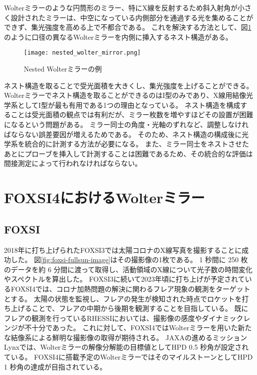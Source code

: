 Wolterミラーのような円筒形のミラー、特にX線を反射するため斜入射角が小さく設計されたミラーは、中空になっている内側部分を通過する光を集めることができず、集光強度を高める上で不都合である。
これを解決する方法として、図\ref{fig:nested_wolter_mirror}のように口径の異なるWolterミラーを内側に挿入するネスト構造がある。\cite{BuitragoCasas2017}

\begin{figure}[b]
\centering
\texttt{[image: nested\_wolter\_mirror.png]}
\caption{Nested Wolterミラーの例}
\label{fig:nested_wolter_mirror}
\end{figure}

ネスト構造を取ることで受光面積を大きくし、集光強度を上げることができる。
Wolterミラーでネスト構造を取ることができるのはI型のみであり、X線用結像光学系としてI型が最も有用である1つの理由となっている。
ネスト構造を構成することは受光面積の観点では有利だが、ミラー枚数を増やすほどその設置が困難になるという問題がある。
ミラー同士の角度・光軸のずれなど、調整しなければならない誤差要因が増えるためである。
そのため、ネスト構造の構成後に光学系を統合的に計測する方法が必要になる。
また、ミラー同士をネストさせたあとにプローブを挿入して計測することは困難であるため、その統合的な評価は間接測定によって行われなければならない。

\clearpage
\newpage

\section{FOXSI4におけるWolterミラー}
\label{chap1_background}

\subsection{FOXSI}
\label{chap1_foxsi}

2018年に打ち上げられたFOXSI3では太陽コロナのX線写真を撮影することに成功した。\cite{weko_20796_1}
図\ref{fig:foxsi-fullsun-image}はその撮影像の1枚である。
1 秒間に 250 枚のデータを約 6 分間に渡って取得し、活動領域のX線について光子数の時間変化やスペクトルを算出した。
FOXSI3に続いて2023年頃に打ち上げが予定されているFOXSI4では、コロナ加熱問題の解決に関わるフレア現象の観測をターゲットとする。
太陽の状態を監視し、フレアの発生が検知された時点でロケットを打ち上げることで、フレアの中期から後期を観測することを目指している。
既にフレアの観測を行っているRHESSI\cite{Liu_2004}においては、撮影像の感度やダイナミックレンジが不十分であった。
これに対して、FOXSI4ではWolterミラーを用いた新たな結像系による鮮明な撮影像の取得が期待される。\cite{2019AGUFMSH31C3315V}
JAXAの進めるミッションLynxでは、Wolterミラーの解像分解能の目標値としてHPD 0.5 秒角が設定されている\cite{Gaskin2019}。
FOXSI4に搭載予定のWolterミラーではそのマイルストーンとしてHPD 1 秒角の達成が目指されている。

